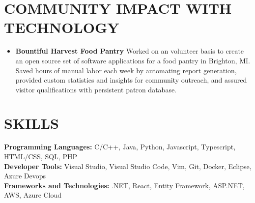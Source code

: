 \documentclass[overlapped]{res}
\begin{document}
\begin{resume}
    \section{COMMUNITY IMPACT WITH TECHNOLOGY}
    
    \begin{itemize}[label={}]  \itemsep -2pt %
        \item \textbf{Bountiful Harvest Food Pantry}
              Worked on an volunteer basis to create an open source set of software applications for a food pantry in Brighton, MI. 
              Saved hours of manual labor each week by automating report generation, \\provided custom statistics and insights for community outreach, and assured visitor qualifications with persistent patron database.
    \end{itemize}
    
    \section{SKILLS}
    \vspace{1mm}
        \textbf{Programming Languages:} C/C++, Java, Python, Javascript, Typescript, HTML/CSS, SQL, PHP \\
        \textbf{Developer Tools:} Visual Studio, Visual Studio Code, Vim, Git, Docker, Eclipse, Azure Devops \\
        \textbf{Frameworks and Technologies:} .NET, React, Entity Framework, ASP.NET, AWS, Azure Cloud
    
\end{resume}
\end{document}
